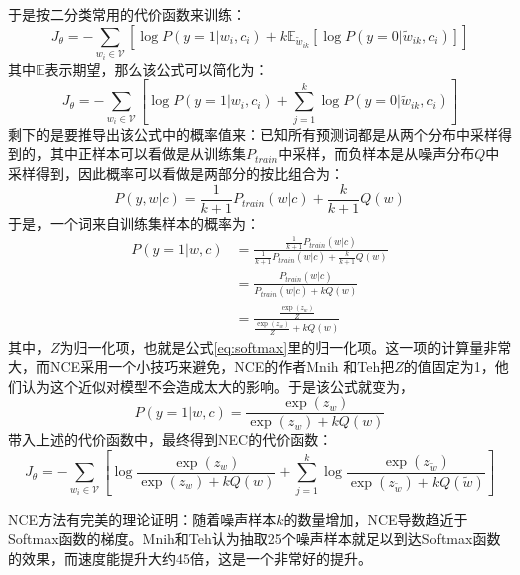\documentclass[12pt,a4paper]{article}
\begin{document}
于是按二分类常用的代价函数来训练：
\begin{equation}
J_\theta = -\sum\limits_{w_i \in \mathcal{V}}{[\log P(y=1|w_i, c_i) + k\mathbb{E}_{\tilde{w}_{ik}}[\log P(y=0|\tilde{w}_{ik}, c_i)]]}
\end{equation}
其中$\mathbb{E}$表示期望，那么该公式可以简化为：
\begin{equation}
J_\theta = -\sum\limits_{w_i \in \mathcal{V}}{[\log P(y=1|w_i, c_i) + \sum\limits_{j=1}^k{\log P(y=0|\tilde{w}_{ik}, c_i)}]}
\end{equation}
剩下的是要推导出该公式中的概率值来：已知所有预测词都是从两个分布中采样得到的，其中正样本可以看做是从训练集${P_{train}}$中采样，而负样本是从噪声分布$Q$中采样得到，因此概率可以看做是两部分的按比组合为：
\begin{equation}
P(y,w|c) = \frac{1}{k+1} P_{train}(w|c) + \frac{k}{k+1}Q(w)
\end{equation}
于是，一个词来自训练集样本的概率为：
\begin{equation}
\begin{split}
P(y=1|w,c) &=  \frac{\frac{1}{k+1} P_{train}(w|c)}{\frac{1}{k+1} P_{train}(w|c) + \frac{k}{k+1}Q(w)} \\
           &= \frac{P_{train}(w|c)}{P_{train}(w|c) + kQ(w)} \\
           &= \frac{\frac{\exp(z_w)}{Z}}{\frac{\exp(z_w)}{Z} + kQ(w)}
\end{split}
\end{equation}
其中，$Z$为归一化项，也就是公式\ref{eq:softmax}里的归一化项。这一项的计算量非常大，而NCE采用一个小技巧来避免，NCE的作者Mnih 和Teh把$Z$的值固定为1，他们认为这个近似对模型不会造成太大的影响。于是该公式就变为，
\begin{equation}
  P(y=1|w,c) = \frac{\exp(z_w)}{\exp(z_w) + kQ(w)}
\end{equation}
带入上述的代价函数中，最终得到NEC的代价函数：
\begin{equation}
J_\theta = -\sum\limits_{w_i \in \mathcal{V}}{\left[\log \frac{\exp(z_w)}{\exp(z_w) + kQ(w)} + \sum\limits_{j=1}^k{\log \frac{\exp(z_{\tilde{w}})}{\exp(z_{\tilde{w}}) + kQ(\tilde{w})}}\right]}
\end{equation}

NCE方法有完美的理论证明：随着噪声样本$k$的数量增加，NCE导数趋近于Softmax函数的梯度。Mnih和Teh认为抽取25个噪声样本就足以到达Softmax函数的效果，而速度能提升大约45倍，这是一个非常好的提升\cite{DBLP:conf/icml/MnihT12}。
\end{document}
